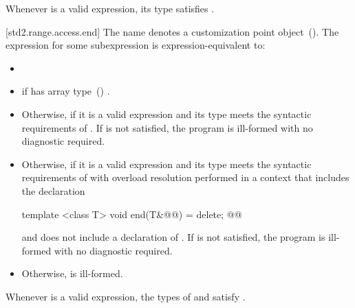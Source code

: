 \pnum
\enternote Whenever  is a valid expression, its
type satisfies . \exitnote

[std2.range.access.end]{}
\pnum
The name  denotes a customization point
object~(). The expression
 for some subexpression  is expression-equivalent to:

\begin{itemize}
\item

\item
   if  has array
  type~() .

\item
  Otherwise, 
   if it is a valid expression and its
  type  meets the syntactic requirements of
  . If
   is not satisfied, the program is ill-formed with
  no diagnostic required.

\item
  Otherwise,  if it is a valid expression and
  its type  meets the syntactic requirements of
   with
  overload resolution performed in a context that includes the 
  declaration
  \begin{codeblock}
  template <class T> void end(T&@\added{\&}@) = delete;
  @@
  \end{codeblock}
  and does not include a declaration of . If 
  is not satisfied, the program is ill-formed with no diagnostic required.

\item
  Otherwise,  is ill-formed.
\end{itemize}

\pnum
\enternote Whenever  is a valid expression, the
types of  and  satisfy
. \exitnote

